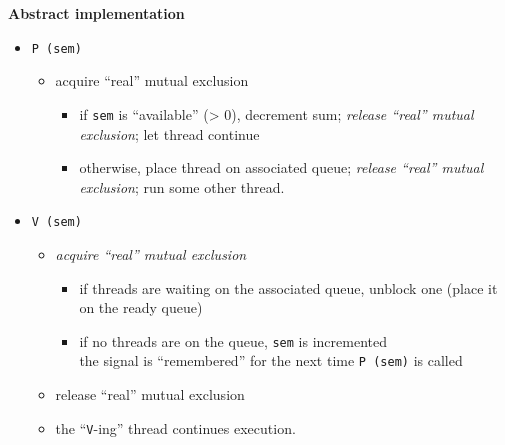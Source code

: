 \documentclass[11pt,a4paper]{article}
\begin{document}
\textbf{Abstract implementation}
\begin{itemize}
    \item \texttt{P\,(sem)}
        \begin{itemize}
            \item acquire ``real'' mutual exclusion
                \begin{itemize}
                    \item if \texttt{sem} is ``available'' (> 0), decrement sum;
                        \emph{release ``real'' mutual exclusion};
                        let thread continue
                    \item otherwise,  place thread on associated queue;
                        \emph{release ``real'' mutual exclusion};
                        run some other thread.
                \end{itemize}
        \end{itemize}
    \item \texttt{V\,(sem)}
        \begin{itemize}
            \item \emph{acquire ``real'' mutual exclusion}
                \begin{itemize}
                    \item if threads are waiting on the associated queue,
                        unblock one (place it on the ready queue)
                    \item if no threads are on the queue, \texttt{sem} is incremented \\
                        the signal is ``remembered'' for the next time \texttt{P\,(sem)}
                        is called
                \end{itemize}
            \item release ``real'' mutual exclusion
            \item the ``\texttt{V}-ing'' thread continues execution.
        \end{itemize}
\end{itemize}
\end{document}
